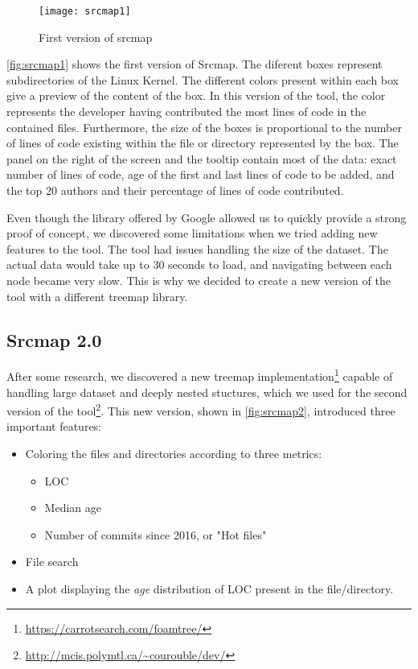 \begin{figure}[htb]
\centering
\texttt{[image: srcmap1]}
\caption{First version of srcmap}
\label{fig:srcmap1}
\end{figure}

\autoref{fig:srcmap1} shows the first version of Srcmap. The diferent boxes represent subdirectories of the Linux Kernel. The different colors present within each box give a preview of the content of the box. In this version of the tool, the color represents the developer having contributed the most lines of code in the contained files. Furthermore, the size of the boxes is proportional to the number of lines of code existing within the file or directory represented by the box. The panel on the right of the screen and the tooltip contain most of the data: exact number of lines of code, age of the first and last lines of code to be added, and the top 20 authors and their percentage of lines of code contributed.

Even though the library offered by Google allowed us to quickly provide a strong proof of concept, we discovered some limitations when we tried adding new features to the tool. The tool had issues handling the size of the dataset. The actual data would take up to 30 seconds to load, and navigating between each node became very slow. This is why we decided to create a new version of the tool with a different treemap library.


\subsection{Srcmap 2.0}


After some research, we discovered a new treemap implementation\footnote{\url{https://carrotsearch.com/foamtree/}} capable of handling large dataset and deeply nested stuctures, which we used for the second version of the tool\footnote{\url{http://mcis.polymtl.ca/~courouble/dev/}}. This new version, shown in \autoref{fig:srcmap2}, introduced three important features: 
\begin{itemize}
	\item Coloring the files and directories according to three metrics:
	\begin{itemize}
		\item \ac{LOC}
		\item Median age
		\item Number of commits since 2016, or "Hot files"
	\end{itemize}
	\item File search
	\item A plot displaying the \textit{age} distribution of \ac{LOC} present in the file/directory.
\end{itemize}

